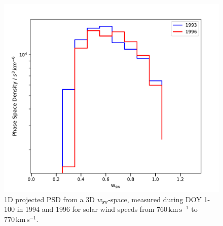 \begin{figure}[h]
	\includegraphics[width=.8\textwidth]{Figures/1D.pdf}
	\centering
	\caption{1D projected PSD from a 3D $w_\mathrm{sw}$-space, measured during DOY 1-100 in 1994 and 1996 for solar wind speeds from $760 \, \mathrm{km\,s^{-1}}$ to $770 \, \mathrm{km\,s^{-1}}$.}
	\label{fig:1d}
\end{figure}